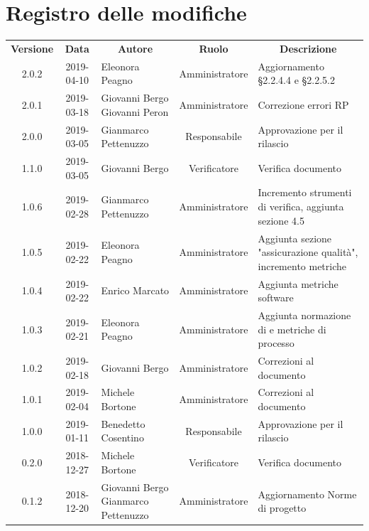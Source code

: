 \documentclass[11pt,a4paper]{article}
\begin{document}
	
	
	{\def\arraystretch{2}\tabcolsep=10pt
	\newpage
	\section*{\centering Registro delle modifiche}
	\begin{tabularx}{\textwidth}{ c | c | p{3.80cm} | c | X }
		\rowcolor{LightBlue}
		\color{white}\bfseries Versione & \color{white}\bfseries Data & \multicolumn{1}{c}{\color{white}\bfseries Autore}
		& \color{white}\bfseries Ruolo & \multicolumn{1}{c}{\color{white}\bfseries Descrizione}\\[0.25cm]
		2.0.2 & 2019-04-10 & Eleonora Peagno & Amministratore & Aggiornamento \S2.2.4.4 e \S2.2.5.2 \\ \hline
		2.0.1 & 2019-03-18 & Giovanni Bergo \newline Giovanni Peron & Amministratore & Correzione errori RP \\ \hline
		2.0.0 & 2019-03-05 & Gianmarco Pettenuzzo & Responsabile & Approvazione per il rilascio \\ \hline
		1.1.0 & 2019-03-05 & Giovanni Bergo & Verificatore & Verifica documento \\ \hline
		1.0.6 & 2019-02-28 & Gianmarco Pettenuzzo & Amministratore & Incremento strumenti di verifica, aggiunta sezione 4.5 \\ \hline
		1.0.5 & 2019-02-22 & Eleonora Peagno & Amministratore & Aggiunta sezione "assicurazione qualità", incremento metriche \\ \hline
		1.0.4 & 2019-02-22 & Enrico Marcato & Amministratore & Aggiunta metriche software \\ \hline
		1.0.3 & 2019-02-21 & Eleonora Peagno & Amministratore & Aggiunta normazione di e metriche di processo \\ \hline
		1.0.2 & 2019-02-18 & Giovanni Bergo & Amministratore & Correzioni al documento \\ \hline
		1.0.1 & 2019-02-04 & Michele Bortone & Amministratore & Correzioni al documento \\ \hline
		1.0.0 & 2019-01-11 & Benedetto Cosentino & Responsabile & Approvazione per il rilascio \\ \hline
		0.2.0 & 2018-12-27 & Michele Bortone & Verificatore & Verifica documento \\ \hline
		0.1.2 & 2018-12-20 & Giovanni Bergo \newline Gianmarco Pettenuzzo & Amministratore & Aggiornamento Norme di progetto \\ \hline

\end{tabularx}}
\end{document}
